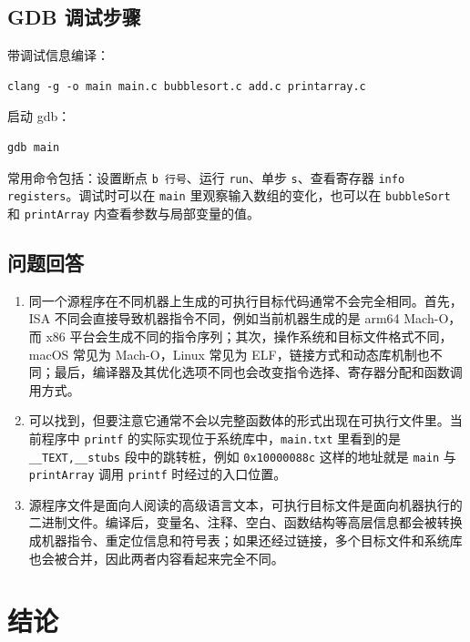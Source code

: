 \documentclass[12pt, a4paper]{academics}
\begin{document}
\subsection{GDB 调试步骤}

带调试信息编译：

\begin{verbatim}
clang -g -o main main.c bubblesort.c add.c printarray.c
\end{verbatim}

启动 gdb：

\begin{verbatim}
gdb main
\end{verbatim}

常用命令包括：设置断点 \texttt{b 行号}、运行 \texttt{run}、单步 \texttt{s}、查看寄存器 \texttt{info registers}。调试时可以在 \texttt{main} 里观察输入数组的变化，也可以在 \texttt{bubbleSort} 和 \texttt{printArray} 内查看参数与局部变量的值。

\subsection{问题回答}

\begin{enumerate}
    \item 同一个源程序在不同机器上生成的可执行目标代码通常不会完全相同。首先，ISA 不同会直接导致机器指令不同，例如当前机器生成的是 arm64 Mach-O，而 x86 平台会生成不同的指令序列；其次，操作系统和目标文件格式不同，macOS 常见为 Mach-O，Linux 常见为 ELF，链接方式和动态库机制也不同；最后，编译器及其优化选项不同也会改变指令选择、寄存器分配和函数调用方式。
    \item 可以找到，但要注意它通常不会以完整函数体的形式出现在可执行文件里。当前程序中 \texttt{printf} 的实际实现位于系统库中，\texttt{main.txt} 里看到的是 \texttt{__TEXT,__stubs} 段中的跳转桩，例如 \texttt{0x10000088c} 这样的地址就是 \texttt{main} 与 \texttt{printArray} 调用 \texttt{printf} 时经过的入口位置。
    \item 源程序文件是面向人阅读的高级语言文本，可执行目标文件是面向机器执行的二进制文件。编译后，变量名、注释、空白、函数结构等高层信息都会被转换成机器指令、重定位信息和符号表；如果还经过链接，多个目标文件和系统库也会被合并，因此两者内容看起来完全不同。
\end{enumerate}

\section{结论}
\end{document}
